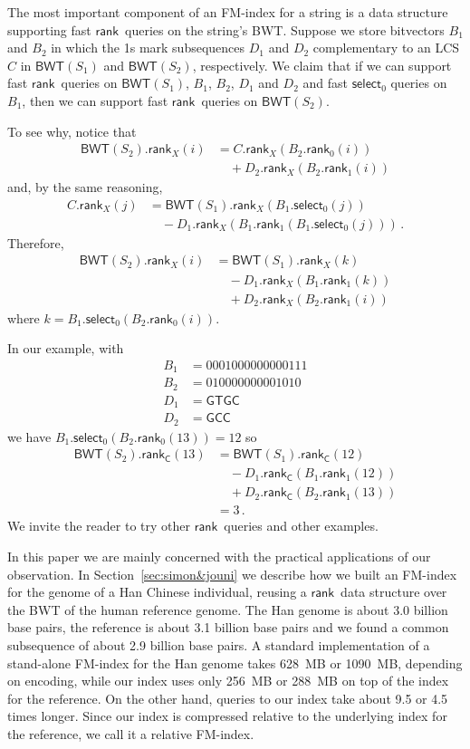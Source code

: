 \documentclass{llncs}
\newcommand{\BWT}
  {\ensuremath{\mathsf{BWT}}}
\newcommand{\rank}
  {\ensuremath{\mathsf{rank}}}
\newcommand{\select}
  {\ensuremath{\mathsf{select}}}
\begin{document}
The most important component of an FM-index for a string is a data structure supporting fast \rank\ queries on the string's BWT.  Suppose we store bitvectors $B_1$ and $B_2$ in which the 1s mark subsequences $D_1$ and $D_2$ complementary to an LCS $C$ in \(\BWT (S_1)\) and \(\BWT (S_2)\), respectively.  We claim that if we can support fast \rank\ queries on \(\BWT (S_1)\), $B_1$, $B_2$, $D_1$ and $D_2$ and fast $\select_0$ queries on $B_1$, then we can support fast \rank\ queries on \(\BWT (S_2)\).

To see why, notice that
\begin{align*}
\BWT (S_2).\rank_X (i)
& = C.\rank_X (B_2.\rank_0 (i))\\
& \quad + D_2.\rank_X (B_2.\rank_1 (i))
\end{align*}
and, by the same reasoning, 
\begin{align*}
C.\rank_X (j)
& = \BWT (S_1).\rank_X (B_1.\select_0 (j))\\
& \quad - D_1.\rank_X (B_1.\rank_1 (B_1.\select_0 (j)))\,.
\end{align*}
Therefore,
\begin{align*}
\BWT (S_2).\rank_X (i)
& = \BWT (S_1).\rank_X (k)\\
& \quad - D_1.\rank_X (B_1.\rank_1 (k))\\
& \quad + D_2.\rank_X (B_2.\rank_1 (i))
\end{align*}
where \(k = B_1.\select_0 (B_2.\rank_0 (i))\).

In our example, with
\begin{align*}
B_1 & = 0001000000000111\\
B_2 & = 010000000001010\\
D_1 & = \mathsf{GTGC}\\
D_2 & = \mathsf{GCC}
\end{align*}
we have \(B_1.\select_0 (B_2.\rank_0 (13)) = 12\) so
\begin{align*}
\BWT (S_2).\rank_\mathsf{C} (13)
& = \BWT (S_1).\rank_\mathsf{C} (12)\\
& \quad - D_1.\rank_\mathsf{C} (B_1.\rank_1 (12))\\
& \quad + D_2.\rank_\mathsf{C} (B_2.\rank_1 (13))\\
& = 3\,.
\end{align*}
We invite the reader to try other \rank\ queries and other examples.

In this paper we are mainly concerned with the practical applications of our observation.  In Section~\ref{sec:simon&jouni} we describe how we built an FM-index for the genome of a Han Chinese individual, reusing a \rank\ data structure over the BWT of the human reference genome. The Han genome is about 3.0 billion base pairs, the reference is about 3.1 billion base pairs and we found a common subsequence of about 2.9 billion base pairs. A standard implementation of a stand-alone FM-index for the Han genome takes 628~MB or 1090~MB, depending on encoding, while our index uses only 256~MB or 288~MB on top of the index for the reference.  On the other hand, queries to our index take about 9.5 or 4.5 times longer.  Since our index is compressed relative to the underlying index for the reference, we call it a relative FM-index.
\end{document}
